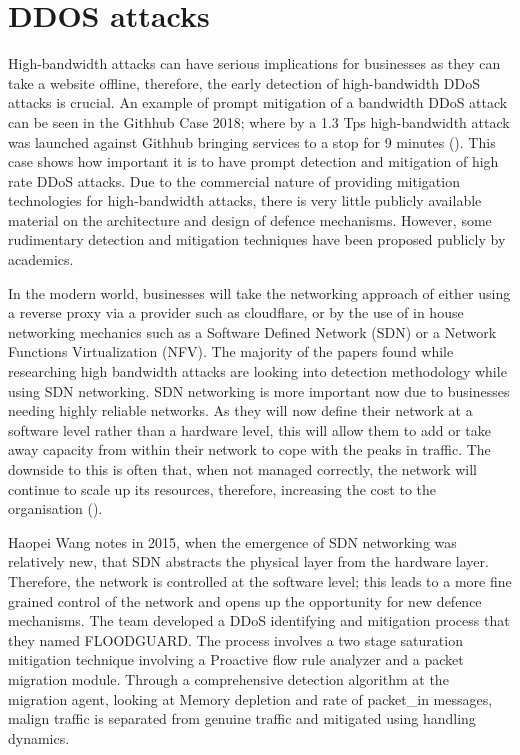 
\section{DDOS attacks} \label{attack2}

High-bandwidth attacks can have serious implications for businesses as they can take a website offline, therefore, the early detection of high-bandwidth DDoS attacks is crucial. An example of prompt mitigation of a bandwidth DDoS attack can be seen in the Githhub Case 2018; where by a 1.3 Tps high-bandwidth attack was launched against Githhub bringing services to a stop for 9 minutes (\cite{Githhubattacks}). This case shows how important it is to have prompt detection and mitigation of high rate DDoS attacks. Due to the commercial nature of providing mitigation technologies for high-bandwidth attacks, there is very little publicly available material on the architecture and design of defence mechanisms. However, some rudimentary detection and mitigation techniques have been proposed publicly by academics. 

In the modern world, businesses will take the networking approach of either using a reverse proxy via a provider such as cloudflare, or by the use of in house networking mechanics such as a Software Defined Network (SDN) or a Network Functions Virtualization (NFV). The majority of the papers found while researching high bandwidth attacks are looking into detection methodology while using SDN networking. SDN networking is more important now due to businesses needing highly reliable networks.  As they will now define their network at a software level rather than a hardware level, this will allow them to add or take away capacity from within their network to cope with the peaks in traffic. The downside to this is often that, when not managed correctly, the network will continue to scale up its resources, therefore, increasing the cost to the organisation (\cite{Techbeacon}). 

Haopei Wang notes in 2015, when the emergence of SDN networking was relatively new, that SDN abstracts the physical layer from the hardware layer. Therefore, the network is controlled at the software level; this leads to a more fine grained control of the network and opens up the opportunity for new defence mechanisms. The team developed a DDoS identifying and mitigation process that they named FLOODGUARD. The process involves a two stage saturation mitigation technique involving a Proactive flow rule analyzer and a packet migration module. Through a comprehensive detection algorithm at the migration agent, looking at Memory depletion and rate of packet\_in messages, malign traffic is separated from genuine traffic and mitigated using handling dynamics. \cite{7266854}


